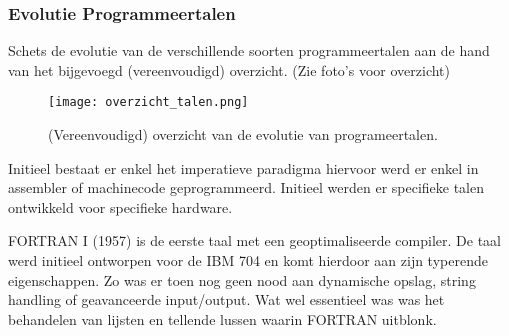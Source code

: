 \documentclass[../main.tex]{subfiles}
\begin{document}
\subsubsection{Evolutie Programmeertalen}
\begin{question}
Schets de evolutie van de verschillende soorten programmeertalen aan de hand van het bijgevoegd (vereenvoudigd) overzicht. (Zie foto's voor overzicht)
\begin{figure}
		\centering
		\texttt{[image: overzicht\_talen.png]}
		\caption{(Vereenvoudigd) overzicht van de evolutie van programeertalen.}
\end{figure}
\end{question}
\begin{solution}
Initieel bestaat er enkel het imperatieve paradigma hiervoor werd er enkel in assembler of machinecode geprogrammeerd.
Initieel werden er specifieke talen ontwikkeld voor specifieke hardware.

FORTRAN I (1957) is de eerste taal met een geoptimaliseerde compiler.
De taal werd initieel ontworpen voor de IBM 704 en komt hierdoor aan zijn typerende eigenschappen.
Zo was er toen nog geen nood aan dynamische opslag, string handling of geavanceerde input/output.
Wat wel essentieel was was het behandelen van lijsten en tellende lussen waarin FORTRAN uitblonk.


\end{solution}
\end{document}
